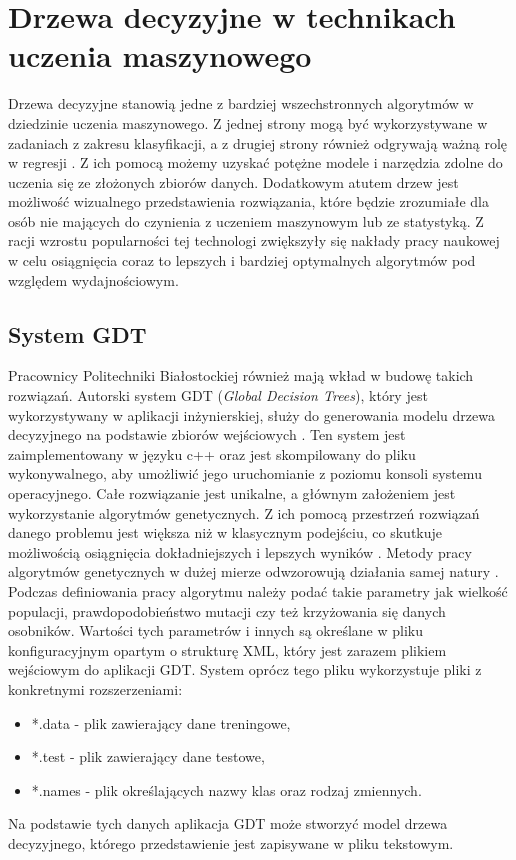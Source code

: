 \section{Drzewa decyzyjne w technikach uczenia maszynowego}

Drzewa decyzyjne stanowią jedne z bardziej wszechstronnych algorytmów w  dziedzinie uczenia maszynowego. Z jednej strony mogą być wykorzystywane w zadaniach z zakresu klasyfikacji, a z drugiej strony również odgrywają ważną rolę w regresji \cite{book_1}. Z ich pomocą możemy uzyskać potężne modele i narzędzia zdolne do uczenia się ze złożonych zbiorów danych. Dodatkowym atutem drzew jest możliwość wizualnego przedstawienia rozwiązania, które będzie zrozumiałe dla osób nie mających do czynienia z uczeniem maszynowym lub ze statystyką. Z racji wzrostu popularności tej technologi zwiększyły się nakłady pracy naukowej w celu osiągnięcia coraz to lepszych i bardziej optymalnych algorytmów pod względem wydajnościowym. 

\subsection{System GDT}
Pracownicy Politechniki Białostockiej również mają wkład w budowę takich rozwiązań. Autorski system GDT (\textit{Global Decision Trees}), który jest wykorzystywany w aplikacji inżynierskiej, służy do generowania modelu drzewa decyzyjnego na podstawie zbiorów wejściowych \cite{sgdt_1}. Ten system jest zaimplementowany w języku c++ oraz jest skompilowany do pliku wykonywalnego, aby umożliwić jego uruchomianie z poziomu konsoli systemu operacyjnego. Całe rozwiązanie jest unikalne, a głównym założeniem jest wykorzystanie algorytmów genetycznych. Z ich pomocą przestrzeń rozwiązań danego problemu jest większa niż w klasycznym podejściu, co skutkuje możliwością osiągnięcia dokładniejszych i lepszych wyników \cite{sgdt_2}. Metody pracy algorytmów genetycznych w dużej mierze odwzorowują działania samej natury \cite{book_2}. Podczas definiowania pracy algorytmu należy podać takie parametry jak wielkość populacji, prawdopodobieństwo mutacji czy też krzyżowania się danych osobników. Wartości tych parametrów i innych są określane w pliku konfiguracyjnym opartym o strukturę XML, który jest zarazem plikiem wejściowym do aplikacji GDT. System oprócz tego pliku wykorzystuje pliki z konkretnymi rozszerzeniami:
\begin{itemize}
	\item *.data - plik zawierający dane treningowe, 
	\item *.test - plik zawierający dane testowe,
	\item *.names - plik określających nazwy klas oraz rodzaj zmiennych.
\end{itemize}
Na podstawie tych danych aplikacja GDT może stworzyć model drzewa decyzyjnego, którego przedstawienie jest zapisywane w pliku tekstowym. 

